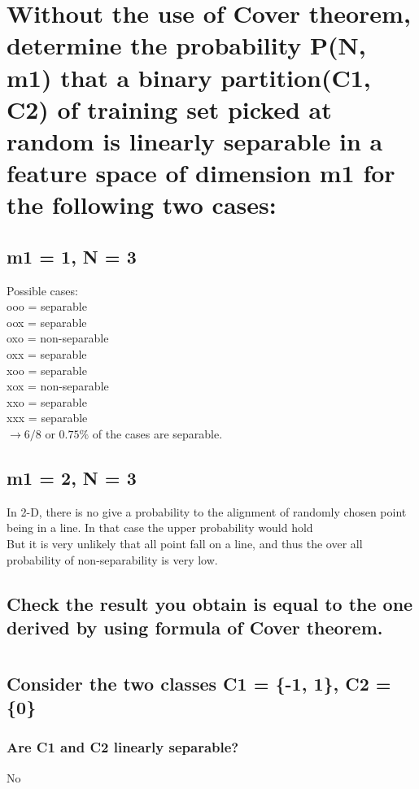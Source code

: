 \documentclass{scrartcl}
\begin{document}
\section{Without the use of Cover theorem, determine the probability P(N, m1) that a binary partition(C1, C2) of training set picked at random is linearly separable in a feature space of dimension m1 for the following two cases:
}
\subsection{ m1 = 1, N = 3
}
Possible cases:\\
ooo = separable\\
oox = separable\\
oxo = non-separable\\
oxx = separable\\
xoo = separable\\
xox = non-separable\\
xxo = separable\\
xxx = separable\\
$\to 6/8$ or $0.75\%$ of the cases are separable.


\subsection{ m1 = 2, N = 3
}
In 2-D, there is no give a probability to the alignment of randomly chosen point being in a line. In that case the upper probability would hold\\
But it is very unlikely that all point fall on a line, and thus the over all probability of non-separability is very low.

\subsection{Check the result you obtain is equal to the one derived by using formula of Cover
theorem.
}



\section{}
\subsection{ Consider the two classes C1 = \{-1, 1\}, C2 = \{0\}}
\subsubsection{Are C1 and C2 linearly separable?}
No
\end{document}
